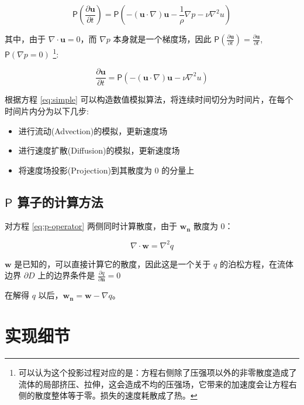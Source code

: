 \documentclass{ctexart}
\begin{document}
\begin{equation}
\mathsf{P}(\frac{\partial \mathbf{u}}{\partial t})
= \mathsf{P}(- (\mathbf{u} \cdot \nabla) \mathbf{u} - \frac{1}{\rho} \nabla p - \nu \nabla^2 u)
\end{equation}

其中，由于 $\nabla \cdot \mathbf{u} = 0$，而 $\nabla p$ 本身就是一个梯度场，因此 $\mathsf{P}(\frac{\partial \mathbf{u}}{\partial t}) = \frac{\partial \mathbf{u}}{\partial t}$, $\mathsf{P} (\nabla p = 0)$ \footnote{
  可以认为这个投影过程对应的是：方程右侧除了压强项以外的非零散度造成了流体的局部挤压、拉伸，这会造成不均的压强场，它带来的加速度会让方程右侧的散度整体等于零。损失的速度耗散成了热。
}:

\begin{equation}
\label{eq:simple}
\frac{\partial \mathbf{u}}{\partial t}
= \mathsf{P}(- (\mathbf{u} \cdot \nabla) \mathbf{u} - \nu \nabla^2 u)
\end{equation}

根据方程 \ref{eq:simple} 可以构造数值模拟算法，将连续时间切分为时间片，在每个时间片内分为以下几步:

\begin{itemize}
\item 进行流动(Advection)的模拟，更新速度场
\item 进行速度扩散(Diffusion)的模拟，更新速度场
\item 将速度场投影(Projection)到其散度为 0 的分量上
\end{itemize}

\subsection{$\mathsf{P}$ 算子的计算方法}
\label{sec:p-operator}
对方程 \ref{eq:p-operator} 两侧同时计算散度，由于 $\mathbf{w_n}$ 散度为 0：

\begin{equation}
\nabla \cdot \mathbf{w} = \nabla^2 q
\end{equation}

$\mathbf{w}$ 是已知的，可以直接计算它的散度，因此这是一个关于 $q$ 的泊松方程，在流体边界 $\partial D$ 上的边界条件是 $\frac{\partial q}{\partial \mathbf{n}} = 0$

在解得 $q$ 以后，$\mathbf{w_n} = \mathbf{w} - \nabla q$。

\section{实现细节}
\end{document}
